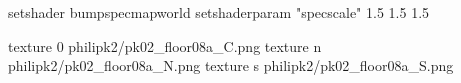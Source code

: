 setshader bumpspecmapworld
setshaderparam "specscale" 1.5 1.5 1.5

texture 0 philipk2/pk02_floor08a_C.png
texture n philipk2/pk02_floor08a_N.png
texture s philipk2/pk02_floor08a_S.png

